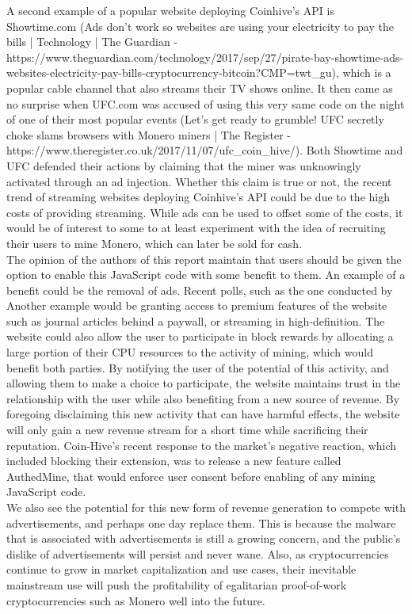 A second example of a popular website deploying Coinhive’s API is Showtime.com (Ads don't work so websites are using your electricity to pay the bills | Technology | The Guardian - https://www.theguardian.com/technology/2017/sep/27/pirate-bay-showtime-ads-websites-electricity-pay-bills-cryptocurrency-bitcoin?CMP=twt_gu), which is a popular cable channel that also streams their TV shows online. It then came as no surprise when UFC.com was accused of using this very same code on the night of one of their most popular events (Let's get ready to grumble! UFC secretly choke slams browsers with Monero miners | The Register - https://www.theregister.co.uk/2017/11/07/ufc_coin_hive/). Both Showtime and UFC defended their actions by claiming that the miner was unknowingly activated through an ad injection. Whether this claim is true or not, the recent trend of streaming websites deploying Coinhive’s API could be due to the high costs of providing streaming. While ads can be used to offset some of the costs, it would be of interest to some to at least experiment with the idea of recruiting their users to mine Monero, which can later be sold for cash.
\\
The opinion of the authors of this report maintain that users should be given the option to enable this JavaScript code with some benefit to them.  An example of a benefit could be the removal of ads. Recent polls, such as the one conducted by  Another example would be granting access to premium features of the website such as journal articles behind a paywall, or streaming in high-definition. The website could also allow the user to participate in block rewards by allocating a large portion of their CPU resources to the activity of mining, which would benefit both parties. By notifying the user of the potential of this activity, and allowing them to make a choice to participate, the website maintains trust in the relationship with the user while also benefiting from a new source of revenue. By foregoing disclaiming this new activity that can have harmful effects, the website will only gain a new revenue stream for a short time while sacrificing their reputation. Coin-Hive’s recent response to the market’s negative reaction, which included blocking their extension, was to release a new feature called AuthedMine, that would enforce user consent before enabling of any mining JavaScript code. 
\\
We also see the potential for this new form of revenue generation to compete with advertisements, and perhaps one day replace them. This is because the malware that is associated with advertisements is still a growing concern, and the public’s dislike of advertisements will persist and never wane. Also, as cryptocurrencies continue to grow in market capitalization and use cases, their inevitable mainstream use will push the profitability of egalitarian proof-of-work cryptocurrencies such as Monero well into the future.

